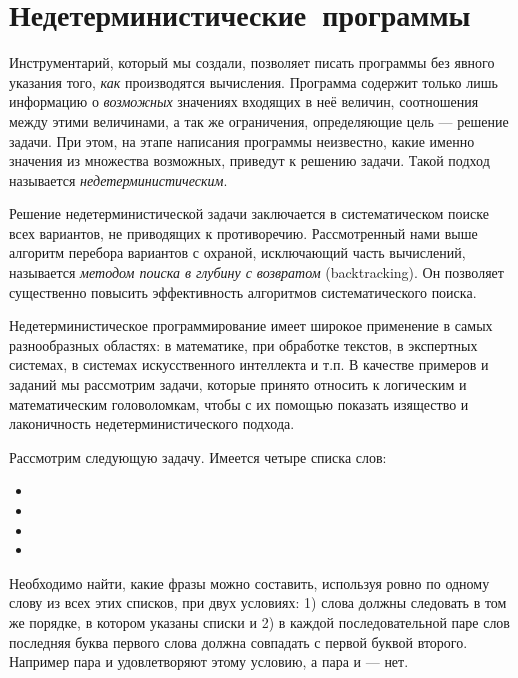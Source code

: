 \section{Недетерминисти\-чес\-кие~программы}%
Инструментарий, который мы создали, позволяет писать программы без явного указания того, \emph{как} производятся вычисления. Программа содержит только лишь информацию о \emph{возможных} значениях входящих в неё величин, соотношения между этими величинами, а так же ограничения, определяющие цель --- решение задачи. При этом, на этапе написания программы неизвестно, какие именно значения из множества возможных, приведут к решению задачи. Такой подход называется \emph{недетерминистическим}.

Решение недетерминистической задачи заключается в систематическом поиске всех вариантов, не приводящих к противоречию. Рассмотренный нами выше алгоритм перебора вариантов с охраной, исключающий часть вычислений, называется \emph{методом поиска в глубину с возвратом} (backtracking). Он позволяет существенно повысить эффективность алгоритмов систематического поиска.

Недетерминистическое программирование имеет широкое применение в самых разнообразных областях: в математике, при обработке текстов, в экспертных системах, в системах искусственного интеллекта и т.п. В качестве примеров и заданий мы рассмотрим задачи, которые принято относить к логическим и математическим головоломкам, чтобы с их помощью показать изящество и лаконичность недетерминистического подхода.

Рассмотрим следующую задачу. Имеется четыре списка слов:

\begin{itemize}
  \item {}
  \item {}
  \item {}
  \item {}
\end{itemize}

Необходимо найти, какие фразы можно составить, используя ровно по одному слову из всех этих списков, при двух условиях: 1) слова должны следовать в том же порядке, в котором указаны списки и 2) в каждой последовательной паре слов последняя буква первого слова должна совпадать с первой буквой второго. Например пара  и  удовлетворяют этому условию, а пара  и  --- нет. 


